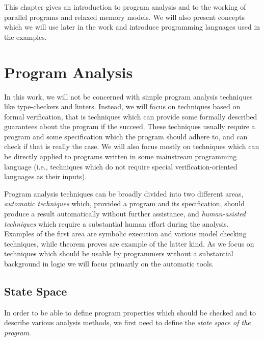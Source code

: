 This chapter gives an introduction to program analysis and to the working of
parallel programs and relaxed memory models.
We will also present concepts which we will use later in the work and introduce programming languages used in the examples.

\section{Program Analysis} %

In this work, we will not be concerned with simple program analysis techniques like type-checkers and linters.
Instead, we will focus on techniques based on formal verification, that is techniques which can provide some formally described guarantees about the program if the succeed.
These techniques usually require a program and some specification which the program should adhere to, and can check if that is really the case.
We will also focus mostly on techniques which can be directly applied to programs written in some mainstream programming language (i.e., techniques which do not require special verification-oriented languages as their inputs).

Program analysis techniques can be broadly divided into two different areas, \emph{automatic techniques} which, provided a program and its specification, should produce a result automatically without further assistance, and \emph{human-asisted techniques} which require a substantial human effort during the analysis.
Examples of the first area are symbolic execution and various model checking techniques, while theorem proves are example of the latter kind.
As we focus on techniques which should be usable by programmers without a substantial background in logic we will focus primarily on the automatic tools.


\subsection{State Space}

In order to be able to define program properties which should be checked and to describe various analysis methods, we first need to define the \emph{state space of the program}.

